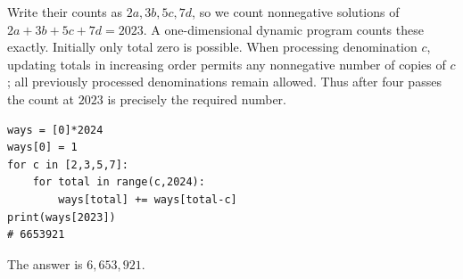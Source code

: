 Write their counts as $2a,3b,5c,7d$, so we count nonnegative solutions of $2a+3b+5c+7d=2023$. A one-dimensional dynamic program counts these exactly. Initially only total zero is possible. When processing denomination $c$, updating totals in increasing order permits any nonnegative number of copies of $c$; all previously processed denominations remain allowed. Thus after four passes the count at $2023$ is precisely the required number.
\begin{verbatim}
ways = [0]*2024
ways[0] = 1
for c in [2,3,5,7]:
    for total in range(c,2024):
        ways[total] += ways[total-c]
print(ways[2023])
# 6653921
\end{verbatim}
The answer is $\boxed{6{,}653{,}921}$.
